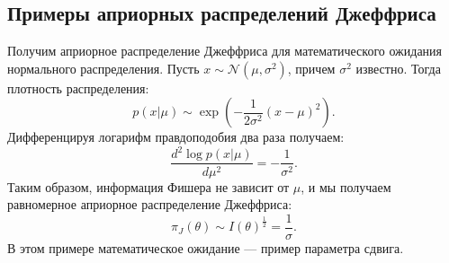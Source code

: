 \subsection{Примеры априорных распределений Джеффриса}
\begin{example}
Получим априорное распределение Джеффриса для математического ожидания нормального распределения.
Пусть $x \sim \mathcal{N}(\mu, \sigma^2)$, причем $\sigma^2$ известно.
Тогда плотность распределения:
\[
p(x | \mu) \sim \exp \left(- \frac{1}{2 \sigma^2} (x - \mu)^2 \right).
\]
Дифференцируя логарифм правдоподобия два раза получаем:
\[
\frac{d^2 \log p(x | \mu)}{d \mu^2} = -\frac{1}{\sigma^2}.
\]
Таким образом, информация Фишера не зависит от $\mu$, и мы получаем равномерное априорное распределение Джеффриса:
\[
\pi_J(\theta) \sim I(\theta)^{\frac12} = \frac{1}{\sigma}.
\]
В этом примере математическое ожидание --- пример параметра сдвига.
\end{example}

